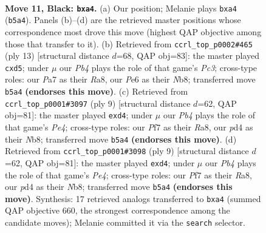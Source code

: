 \documentclass[11pt]{article}
\begin{document}
\clearpage

\begin{figure}[p]\centering
\begin{subfigure}{0.46\textwidth}\centering
\resizebox{\linewidth}{!}{%
\newchessgame
\chessboard[
  setfen={rnq1kb1r/p4pp1/2p1pnbp/1pP5/PP1P1P1P/6N1/6P1/R1BQKBNR b KQkq - 0 11},
  showmover=false,
  pgfstyle=straightmove, color=movearrow, markmove={b5-a4}
]}
\caption{}
\end{subfigure}\hfill
\begin{subfigure}{0.46\textwidth}\centering
\resizebox{\linewidth}{!}{%
\newchessgame
\chessboard[
  setfen={rn2kbnr/ppq2pp1/2p1p2p/3PPb2/3P3P/2N5/PP3PP1/R1BQKBNR b KQkq - 0 7},
  showmover=false,
  pgfstyle=straightmove, color=movearrow, markmove={c6-d5}
]}
\caption{}
\end{subfigure}
\\[4pt]
\begin{subfigure}{0.46\textwidth}\centering
\resizebox{\linewidth}{!}{%
\newchessgame
\chessboard[
  setfen={rnbqkb1r/pp3ppp/2p2n2/3pp3/2PP4/2NBP3/PP3PPP/R1BQK1NR b KQkq - 1 5},
  showmover=false,
  pgfstyle=straightmove, color=movearrow, markmove={e5-d4}
]}
\caption{}
\end{subfigure}\hfill
\begin{subfigure}{0.46\textwidth}\centering
\resizebox{\linewidth}{!}{%
\newchessgame
\chessboard[
  setfen={rnbqkb1r/pp3ppp/2p2n2/3pp3/2PP4/2NBP3/PP3PPP/R1BQK1NR b KQkq - 1 5},
  showmover=false,
  pgfstyle=straightmove, color=movearrow, markmove={e5-d4}
]}
\caption{}
\end{subfigure}
\caption{\textbf{Move 11, Black: \texttt{bxa4}.} (a) Our position; Melanie plays \texttt{bxa4} (\texttt{b5a4}). Panels (b)--(d) are the retrieved master positions whose correspondence most drove this move (highest QAP objective among those that transfer to it). (b) Retrieved from \texttt{ccrl\_top\_p0002\#465} (ply 13) [structural distance $d$=68, QAP obj=83]: the master played \texttt{cxd5}; under $\mu$ our \emph{Pb4} plays the role of that game's \emph{Pc3}; cross-type roles: our \emph{P}a7 as their \emph{R}a8, our \emph{P}e6 as their \emph{N}b8; transferred move \texttt{b5a4} \textbf{(endorses this move)}. (c) Retrieved from \texttt{ccrl\_top\_p0001\#3097} (ply 9) [structural distance $d$=62, QAP obj=81]: the master played \texttt{exd4}; under $\mu$ our \emph{Pb4} plays the role of that game's \emph{Pe4}; cross-type roles: our \emph{P}f7 as their \emph{R}a8, our \emph{p}d4 as their \emph{N}b8; transferred move \texttt{b5a4} \textbf{(endorses this move)}. (d) Retrieved from \texttt{ccrl\_top\_p0001\#3098} (ply 9) [structural distance $d$=62, QAP obj=81]: the master played \texttt{exd4}; under $\mu$ our \emph{Pb4} plays the role of that game's \emph{Pe4}; cross-type roles: our \emph{P}f7 as their \emph{R}a8, our \emph{p}d4 as their \emph{N}b8; transferred move \texttt{b5a4} \textbf{(endorses this move)}. Synthesis: 17 retrieved analogs transferred to \texttt{bxa4} (summed QAP objective 660, the strongest correspondence among the candidate moves); Melanie committed it via the \texttt{search} selector.}
\label{fig:thought-m21}
\end{figure}
\end{document}
